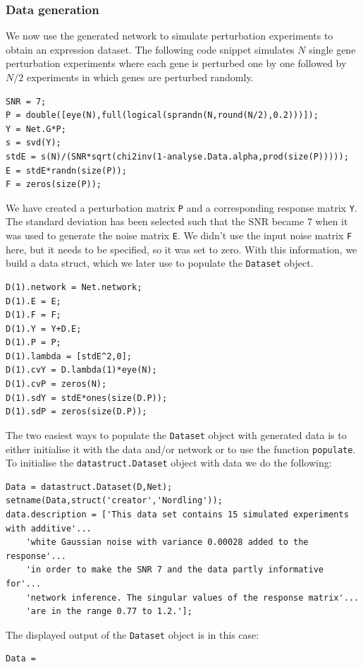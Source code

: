 \begin{bibunit}
\subsubsection{Data generation}
\label{sec:data-generation-example}
We now use the generated network to simulate perturbation experiments to obtain an expression dataset.
The following code snippet simulates \(N\) single gene perturbation experiments where each gene is perturbed one by one followed by \(N/2\) experiments in which genes are perturbed randomly.
\begin{verbatim}
SNR = 7;
P = double([eye(N),full(logical(sprandn(N,round(N/2),0.2)))]);
Y = Net.G*P;
s = svd(Y);
stdE = s(N)/(SNR*sqrt(chi2inv(1-analyse.Data.alpha,prod(size(P)))));
E = stdE*randn(size(P));
F = zeros(size(P));
\end{verbatim}
We have created a perturbation matrix \texttt{P} and a corresponding response matrix \texttt{Y}.
The standard deviation has been selected such that the SNR became 7 when it was used to generate the noise matrix \texttt{E}.
We didn't use the input noise matrix \texttt{F} here, but it needs to be specified, so it was set to zero.
With this information, we build a data struct, which we later use to populate the \texttt{Dataset} object.
\begin{verbatim}
D(1).network = Net.network;
D(1).E = E;
D(1).F = F;
D(1).Y = Y+D.E;
D(1).P = P;
D(1).lambda = [stdE^2,0];
D(1).cvY = D.lambda(1)*eye(N);
D(1).cvP = zeros(N);
D(1).sdY = stdE*ones(size(D.P));
D(1).sdP = zeros(size(D.P));
\end{verbatim}

The two easiest ways to populate the \texttt{Dataset} object with generated data is to either initialise it with the data and/or network or to use the function \texttt{populate}.
To initialise the \texttt{datastruct.Dataset} object with data we do the following:
\begin{verbatim}
Data = datastruct.Dataset(D,Net);
setname(Data,struct('creator','Nordling'));
data.description = ['This data set contains 15 simulated experiments with additive'...
    'white Gaussian noise with variance 0.00028 added to the response'...
    'in order to make the SNR 7 and the data partly informative for'...
    'network inference. The singular values of the response matrix'...
    'are in the range 0.77 to 1.2.'];
\end{verbatim}

The displayed output of the \texttt{Dataset} object is in this case:
\begin{verbatim}
Data =


\end{verbatim}
\end{bibunit}
